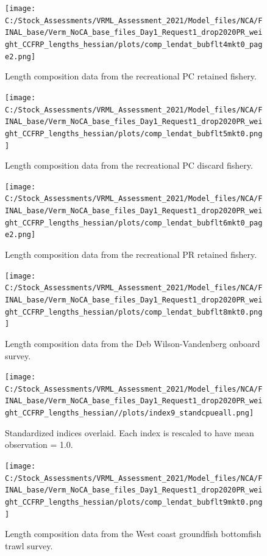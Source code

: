 \documentclass[
  english,
  a4paper,
]{article}
\begin{document}
\begin{figure}
\centering
\texttt{[image: C:/Stock\_Assessments/VRML\_Assessment\_2021/Model\_files/NCA/FINAL\_base/Verm\_NoCA\_base\_files\_Day1\_Request1\_drop2020PR\_weight\_CCFRP\_lengths\_hessian/plots/comp\_lendat\_bubflt4mkt0\_page2.png]}
\caption{Length composition data from the recreational PC retained fishery.\label{fig:len-data-REC-PC}}
\end{figure}

\begin{figure}
\centering
\texttt{[image: C:/Stock\_Assessments/VRML\_Assessment\_2021/Model\_files/NCA/FINAL\_base/Verm\_NoCA\_base\_files\_Day1\_Request1\_drop2020PR\_weight\_CCFRP\_lengths\_hessian/plots/comp\_lendat\_bubflt5mkt0.png]}
\caption{Length composition data from the recreational PC discard fishery.\label{fig:len-data-REC-PC-DIS}}
\end{figure}

\begin{figure}
\centering
\texttt{[image: C:/Stock\_Assessments/VRML\_Assessment\_2021/Model\_files/NCA/FINAL\_base/Verm\_NoCA\_base\_files\_Day1\_Request1\_drop2020PR\_weight\_CCFRP\_lengths\_hessian/plots/comp\_lendat\_bubflt6mkt0\_page2.png]}
\caption{Length composition data from the recreational PR retained fishery.\label{fig:len-data-REC-PR}}
\end{figure}

\begin{figure}
\centering
\texttt{[image: C:/Stock\_Assessments/VRML\_Assessment\_2021/Model\_files/NCA/FINAL\_base/Verm\_NoCA\_base\_files\_Day1\_Request1\_drop2020PR\_weight\_CCFRP\_lengths\_hessian/plots/comp\_lendat\_bubflt8mkt0.png]}
\caption{Length composition data from the Deb Wilson-Vandenberg onboard survey.\label{fig:len-data-DWV-ONBOARD}}
\end{figure}

\begin{figure}
\centering
\texttt{[image: C:/Stock\_Assessments/VRML\_Assessment\_2021/Model\_files/NCA/FINAL\_base/Verm\_NoCA\_base\_files\_Day1\_Request1\_drop2020PR\_weight\_CCFRP\_lengths\_hessian//plots/index9\_standcpueall.png]}
\caption{Standardized indices overlaid. Each index is rescaled to have mean observation = 1.0.\label{fig:cpueall}}
\end{figure}

\begin{figure}
\centering
\texttt{[image: C:/Stock\_Assessments/VRML\_Assessment\_2021/Model\_files/NCA/FINAL\_base/Verm\_NoCA\_base\_files\_Day1\_Request1\_drop2020PR\_weight\_CCFRP\_lengths\_hessian/plots/comp\_lendat\_bubflt9mkt0.png]}
\caption{Length composition data from the West coast groundfish bottomfish trawl survey.\label{fig:len-data-NWFSC-TWL}}
\end{figure}
\end{document}
